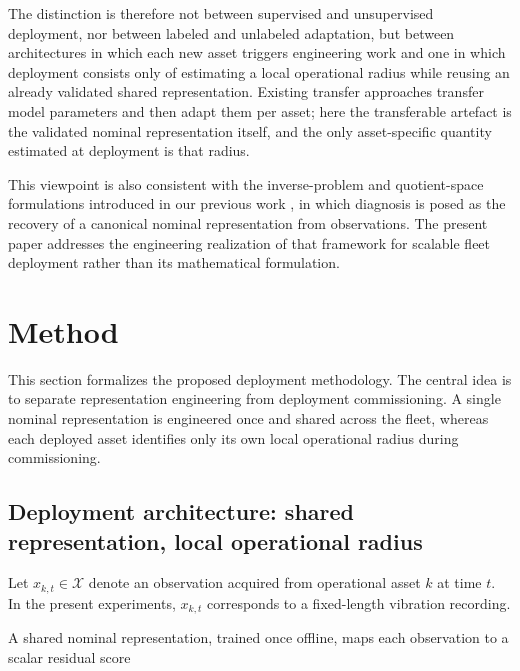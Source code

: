 \documentclass[numbered]{trbunofficial}
\begin{document}
The distinction is therefore not between supervised and unsupervised
deployment, nor between labeled and unlabeled adaptation, but between
architectures in which each new asset triggers engineering work and one in
which deployment consists only of estimating a local operational radius while
reusing an already validated shared representation. Existing transfer
approaches transfer model parameters and then adapt them per asset; here the
transferable artefact is the validated nominal representation itself, and the
only asset-specific quantity estimated at deployment is that radius.

This viewpoint is also consistent with the inverse-problem and
quotient-space formulations introduced in our previous work
\citep{disanti2026inverse,disanti2026quotient}, in which diagnosis is posed
as the recovery of a canonical nominal representation from observations.
The present paper addresses the engineering realization of that framework
for scalable fleet deployment rather than its mathematical formulation.


\section{Method}
\label{sec:method}

This section formalizes the proposed deployment methodology. The central idea
is to separate representation engineering from deployment commissioning. A
single nominal representation is engineered once and shared across the fleet,
whereas each deployed asset identifies only its own local operational radius
during commissioning.

\subsection{Deployment architecture: shared representation, local operational radius}

Let $x_{k,t}\in\mathcal{X}$ denote an observation acquired from operational
asset $k$ at time $t$. In the present experiments,
$x_{k,t}$ corresponds to a fixed-length vibration recording.

A shared nominal representation, trained once offline, maps each observation
to a scalar residual score
\end{document}
